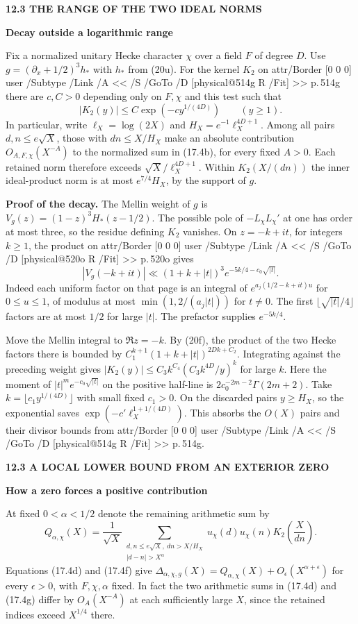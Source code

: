\documentclass[11pt,letterpaper]{article}
\makeatletter
\newcommand{\rightmarktext}{}
\newcommand{\printfolio}{}
\newcommand{\leaf}[4]{\clearpage\gdef\printfolio{#1}\gdef\rightmarktext{#2}%
  {\small\sffamily\bfseries\color{ink}#3\par}\vspace{3pt}%
  {\LARGE\bfseries #4\par}\vspace{5pt}}
\newcommand{\point}[1]{\par\smallskip\textbf{#1.}\enspace\ignorespaces}
\newcommand{\MusicPDFPageRef}[1]{\pdfpageref\csname physical@#1\endcsname\space\space 0 R}
\newcommand{\pagelink}[2]{\leavevmode\pdfstartlink attr{/Border [0 0 0]} user{%
  /Subtype /Link /A << /S /GoTo /D [\MusicPDFPageRef{#1} /Fit] >>}%
  {\color{ink}#2}\pdfendlink}
\newcommand{\pg}[1]{\pagelink{#1}{p.\,#1}}
\makeatother
\begin{document}
\leaf{514k}{The kernel for the fixed test}{12.3 \quad THE RANGE OF THE TWO IDEAL NORMS}{Decay outside a logarithmic range}
Fix a normalized unitary Hecke character $\chi$ over a field $F$ of
degree $D$. Use $g=(\partial_x+1/2)^3h_*$ with $h_*$ from (20u).
For the kernel $K_2$ on \pg{514g} there are $c,C>0$ depending only
on $F,\chi$ and this test such that
\[
                 |K_2(y)|\le C\exp(-c y^{1/(4D)})\qquad(y\ge1).
                 \tag{17.4f}
\]
In particular, write $\ell_X=\log(2X)$ and $H_X=e^{-1}\ell_X^{4D+1}$.
Among all pairs $d,n\le e\sqrt X$, those with $dn\le X/H_X$ make
an absolute contribution $O_{A,F,\chi}(X^{-A})$ to the normalized
sum in (17.4b), for every fixed $A>0$. Each retained norm therefore
exceeds $\sqrt X/\ell_X^{4D+1}$. Within $K_2(X/(dn))$ the inner
ideal-product norm is at most $e^{7/4}H_X$, by the support of $g$.

\point{Proof of the decay}
The Mellin weight of $g$ is $V_g(z)=(1-z)^3H_*(z-1/2)$.
The possible pole of $-L_\chi L_\chi'$ at one has order at most
three, so the residue defining $K_2$ vanishes. On $z=-k+it$,
for integers $k\ge1$, the product on \pg{520o} gives
\[
 |V_g(-k+it)|\ll (1+k+|t|)^3 e^{-5k/4-c_0\sqrt{|t|}} .
\]
Indeed each uniform factor on that page is an integral of
$e^{a_j(1/2-k+it)u}$ for $0\le u\le1$, of modulus at most
$\min(1,2/(a_j|t|))$ for $t\ne0$. The first
$\lfloor\sqrt{|t|}/4\rfloor$ factors are at most $1/2$ for large
$|t|$. The prefactor supplies $e^{-5k/4}$.

Move the Mellin integral to $\Re z=-k$. By (20f), the product of
the two Hecke factors there is bounded by
$C_1^{k+1}(1+k+|t|)^{2Dk+C_2}$. Integrating against the preceding
weight gives $|K_2(y)|\le C_3 k^{C_4}(C_3 k^{4D}/y)^k$ for large
$k$. Here the moment of $|t|^m e^{-c_0\sqrt{|t|}}$ on the positive
half-line is $2c_0^{-2m-2}\Gamma(2m+2)$. Take
$k=\lfloor c_1y^{1/(4D)}\rfloor$ with small fixed $c_1>0$.
On the discarded pairs $y\ge H_X$, so the exponential saves
$\exp(-c'\ell_X^{1+1/(4D)})$. This absorbs the $O(X)$ pairs and
their divisor bounds from \pg{514g}.

\leaf{514l}{The signed sum on an interval}{12.3 \quad A LOCAL LOWER BOUND FROM AN EXTERIOR ZERO}{How a zero forces a positive contribution}
At fixed $0<\alpha<1/2$ denote the remaining arithmetic sum by
\[
 Q_{\alpha,\chi}(X)=\frac1{\sqrt X}
 \sum_{\substack{d,n\le e\sqrt X,\ dn>X/H_X\\ |d-n|>X^\alpha}}
 u_\chi(d)u_\chi(n)K_2\!\left(\frac{X}{dn}\right).
 \tag{17.4g}
\]
Equations (17.4d) and (17.4f) give
$\Delta_{\alpha,\chi,g}(X)=Q_{\alpha,\chi}(X)+O_\epsilon(X^{\alpha+\epsilon})$
for every $\epsilon>0$, with $F,\chi,\alpha$ fixed. In fact the two
arithmetic sums in (17.4d) and (17.4g) differ by $O_A(X^{-A})$
at each sufficiently large $X$, since the retained indices exceed
$X^{1/4}$ there.
\end{document}
